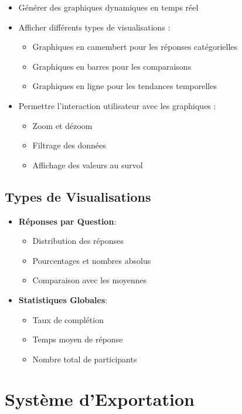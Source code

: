 \documentclass[a4paper,12pt]{report}
\begin{document}
\begin{itemize}
    \item Générer des graphiques dynamiques en temps réel
    \item Afficher différents types de visualisations :
    \begin{itemize}
        \item Graphiques en camembert pour les réponses catégorielles
        \item Graphiques en barres pour les comparaisons
        \item Graphiques en ligne pour les tendances temporelles
    \end{itemize}
    \item Permettre l'interaction utilisateur avec les graphiques :
    \begin{itemize}
        \item Zoom et dézoom
        \item Filtrage des données
        \item Affichage des valeurs au survol
    \end{itemize}
\end{itemize}

\subsection{Types de Visualisations}
\begin{itemize}
    \item \textbf{Réponses par Question}:
    \begin{itemize}
        \item Distribution des réponses
        \item Pourcentages et nombres absolus
        \item Comparaison avec les moyennes
    \end{itemize}
    \item \textbf{Statistiques Globales}:
    \begin{itemize}
        \item Taux de complétion
        \item Temps moyen de réponse
        \item Nombre total de participants
    \end{itemize}
\end{itemize}

\section{Système d'Exportation}
\end{document}
